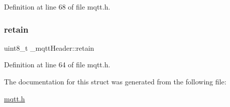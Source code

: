 Definition at line 68 of file mqtt.\+h.

\mbox{\label{struct__mqttHeader_a4bb9f2efb2fad66697a49ca223404707}} 
\subsubsection{\texorpdfstring{retain}{retain}}
{\footnotesize\ttfamily uint8\+\_\+t \+\_\+mqtt\+Header\+::retain}



Definition at line 64 of file mqtt.\+h.



The documentation for this struct was generated from the following file\+:\begin{DoxyCompactItemize}
\item 
\hyperlink{mqtt_8h}{mqtt.\+h}\end{DoxyCompactItemize}

